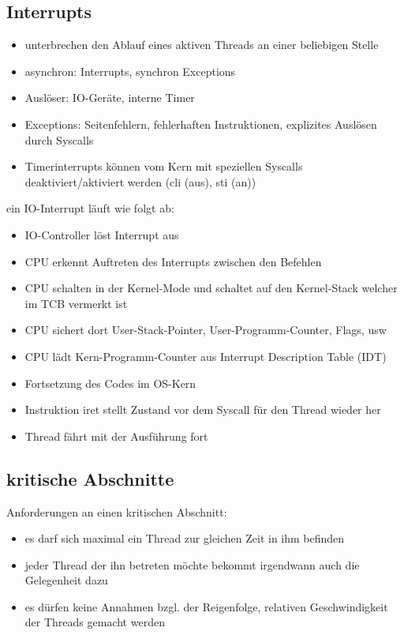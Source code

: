 \documentclass[12pt,a4paper]{article}
\begin{document}
\subsection{Interrupts}
\begin{itemize}
\item unterbrechen den Ablauf eines aktiven Threads an einer beliebigen Stelle
\item asynchron: Interrupts, synchron Exceptions
\item Auslöser: IO-Geräte, interne Timer
\item Exceptions: Seitenfehlern, fehlerhaften Instruktionen, explizites Auslösen durch Syscalls
\item Timerinterrupts können vom Kern mit speziellen Syscalls deaktiviert/aktiviert werden (cli (aus), sti (an))
\end{itemize}
ein IO-Interrupt läuft wie folgt ab:
\begin{itemize}
\item IO-Controller löst Interrupt aus
\item CPU erkennt Auftreten des Interrupts zwischen den Befehlen
\item CPU schalten in der Kernel-Mode und schaltet auf den Kernel-Stack welcher im TCB vermerkt ist
\item CPU sichert dort User-Stack-Pointer, User-Programm-Counter, Flags, usw
\item CPU lädt Kern-Programm-Counter aus Interrupt Description Table (IDT)
\item Fortsetzung des Codes im OS-Kern
\item Instruktion iret stellt Zustand vor dem Syscall für den Thread wieder her
\item Thread fährt mit der Ausführung fort
\end{itemize}

\subsection{kritische Abschnitte}
Anforderungen an einen kritischen Abschnitt:
\begin{itemize}
\item es darf sich maximal ein Thread zur gleichen Zeit in ihm befinden
\item jeder Thread der ihn betreten möchte bekommt irgendwann auch die Gelegenheit dazu
\item es dürfen keine Annahmen bzgl. der Reigenfolge, relativen Geschwindigkeit der Threads gemacht werden
\end{itemize}
\end{document}
